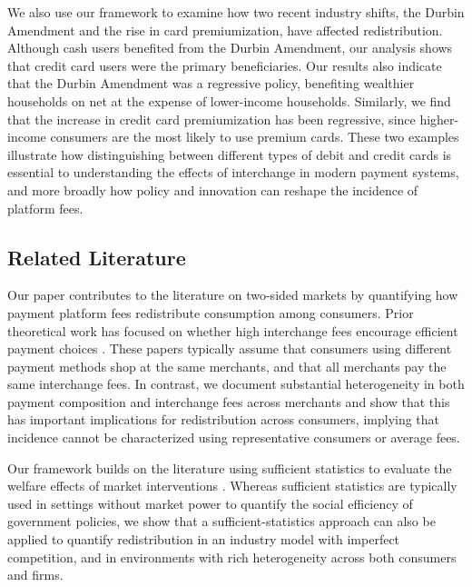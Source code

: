 \documentclass[11pt,english]{article}
\theoremstyle{remark}
\begin{document}
We also use our framework to examine how two recent industry shifts, the Durbin Amendment and the rise in card premiumization, have affected redistribution.
Although cash users benefited from the Durbin Amendment, our analysis shows that credit card users were the primary beneficiaries.
Our results also indicate that the Durbin Amendment was a regressive policy, benefiting wealthier households on net at the expense of lower-income households.
Similarly, we find that the increase in credit card premiumization has been regressive, since higher-income consumers are the most likely to use premium cards. These two examples illustrate how distinguishing between different types of debit and credit cards is essential to understanding the effects of interchange in modern payment systems, and more broadly how policy and innovation can reshape the incidence of platform fees.



\subsection{Related Literature}

Our paper contributes to the literature on two-sided markets by quantifying how payment platform fees redistribute consumption among consumers.
Prior theoretical work has focused on whether high interchange fees encourage efficient payment choices \citep{Rochet.Tirole2011,Wright2012,Edelman.Wright2015}.
These papers typically assume that consumers using different payment methods shop at the same merchants, and that all merchants pay the same interchange fees.
In contrast, we document substantial heterogeneity in both payment composition and interchange fees across merchants and show that this has important implications for redistribution across consumers, implying that incidence cannot be characterized using representative consumers or average fees.

Our framework builds on the literature using sufficient statistics to evaluate the welfare effects of market interventions \citep{Chetty2009, Kleven2021}.
Whereas sufficient statistics are typically used in settings without market power to quantify the social efficiency of government policies, we show that a sufficient-statistics approach can also be applied to quantify redistribution in an industry model with imperfect competition, and in environments with rich heterogeneity across both consumers and firms.
\end{document}
